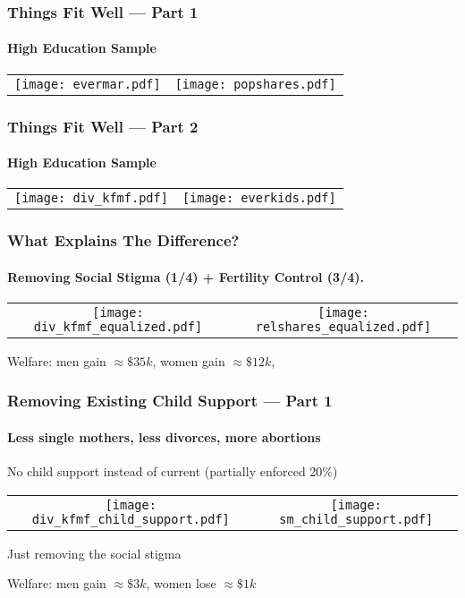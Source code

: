 \documentclass[aspectratio=169]{beamer}
\begin{document}
\begin{frame}
\frametitle{Things Fit Well --- Part 1}
\framesubtitle{High Education Sample}
\begin{center}

\begin{tabular}{c c}
\hspace{-1cm}\texttt{[image: evermar.pdf]} &\hspace{-0.5cm} \texttt{[image: popshares.pdf]} \\
\end{tabular}
\end{center}
\end{frame}


\begin{frame}
\frametitle{Things Fit Well --- Part 2}
\framesubtitle{High Education Sample}
\begin{center}
\begin{tabular}{c c}
\hspace{-1cm}\texttt{[image: div\_kfmf.pdf]}  & \hspace{-0.5cm} \texttt{[image: everkids.pdf]} 
\end{tabular}
\end{center}
\end{frame}

\begin{frame}[label=counterfactuals-abortions]
\frametitle{What Explains The Difference?}
\framesubtitle{Removing Social Stigma (1/4) + Fertility Control (3/4).}
\begin{center}
\begin{tabular}{c c}
\hspace{-1cm}\texttt{[image: div\_kfmf\_equalized.pdf]}  & \hspace{-0.5cm} \texttt{[image: relshares\_equalized.pdf]} 
\end{tabular}
\end{center}
Welfare: men gain $\approx \$35k$, women gain $\approx \$12k$, \hyperlink{welfare-abortions}{} 
\end{frame}


\begin{frame}[label=counterfactuals-child-support]
\frametitle{Removing Existing Child Support --- Part 1}
\framesubtitle{Less single mothers, less divorces, more abortions}
No child support instead of current (partially enforced 20\%)
\begin{center}
\begin{tabular}{c c}
\hspace{-1cm}\texttt{[image: div\_kfmf\_child\_support.pdf]}  & \hspace{-0.5cm} \texttt{[image: sm\_child\_support.pdf]} 
\end{tabular}
\end{center}
Just removing the social stigma \hyperlink{counterfactuals-social-stigma}{} 

Welfare: men gain $\approx \$3k$, women lose $\approx \$1k$ \hyperlink{welfare-child-support}{} 
\end{frame}
\end{document}
